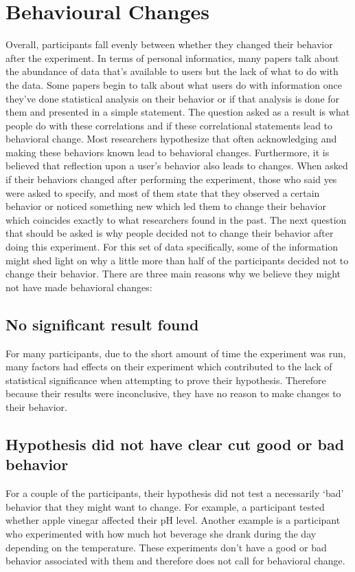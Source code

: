 \section{Behavioural Changes}
Overall, participants fall evenly between whether they changed their behavior after the experiment. In terms of personal informatics, many papers talk about the abundance of data that’s available to users but the lack of what to do with the data. Some papers begin to talk about what users do with information once they’ve done statistical analysis on their behavior or if that analysis is done for them and presented in a simple statement. The question asked as a result is what people do with these correlations and if these correlational statements lead to behavioral change. 
    Most researchers hypothesize that often acknowledging and making these behaviors known lead to behavioral changes. Furthermore, it is believed that reflection upon a user's behavior also leads to changes. When asked if their behaviors changed after performing the experiment, those who said yes were asked to specify, and most of them state that they observed a certain behavior or noticed something new which led them to change their behavior which coincides exactly to what researchers found in the past. 
    The next question that should be asked is why people decided not to change their behavior after doing this experiment. For this set of data specifically, some of the information might shed light on why a little more than half of the participants decided not to change their behavior. There are three main reasons why we believe they might not have made behavioral changes:
    \subsection{No significant result found}
    For many participants, due to the short amount of time the experiment was run, many factors had effects on their experiment which contributed to the lack of statistical significance when attempting to prove their hypothesis. Therefore because their results were inconclusive, they have no reason to make changes to their behavior.
    \subsection{Hypothesis did not have clear cut good or bad behavior}
    For a couple of the participants, their hypothesis did not test a necessarily ‘bad’ behavior that they might want to change. For example, a participant tested whether apple vinegar affected their pH level. Another example is a participant who experimented with how much hot beverage she drank during the day depending on the temperature. These experiments don’t have a good or bad behavior associated with them and therefore does not call for behavioral change. 
